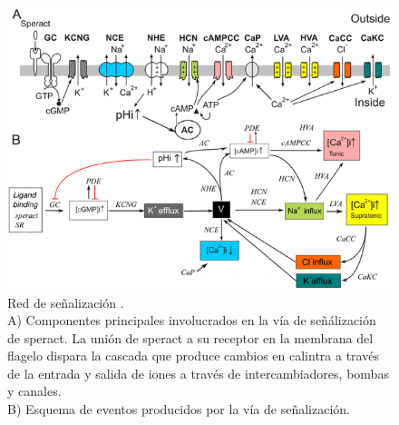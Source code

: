 \begin{figure}[hbt]
\includegraphics[width=0.9\linewidth]{gfx/redErizoBioquimica}
\caption[Red de se\~nalizaci\'on]{Red de se\~nalizaci\'on \citeauthor{Espinal2011} \citep{Espinal2011}.\\
A) Componentes principales involucrados en la vía de señálización de speract. La unión de speract a su receptor en la membrana del flagelo dispara la cascada que produce cambios en \ac{calintra} a través de la entrada y salida de iones a través de intercambiadores, bombas y canales.
\\
B) Esquema de eventos producidos por la vía de señalización.}\label{fig:erizobBioquimica}
\end{figure}

